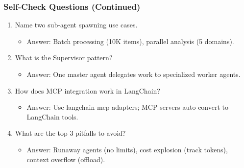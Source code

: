 \documentclass[aspectratio=169,11pt]{beamer}
\begin{document}
\begin{frame}[fragile]
\frametitle{Self-Check Questions (Continued)}

\begin{enumerate}
    \setlength{\itemsep}{1pt}
  \setcounter{enumi}{4}
  \item Name two sub-agent spawning use cases.
  \begin{itemize}
    \setlength{\itemsep}{1pt}
    \small
    \item {\color{docgray}Answer: Batch processing (10K items), parallel analysis (5 domains).}
  \end{itemize}

  \vspace{0.5em}
  \item What is the Supervisor pattern?
  \begin{itemize}
    \setlength{\itemsep}{1pt}
    \small
    \item {\color{docgray}Answer: One master agent delegates work to specialized worker agents.}
  \end{itemize}

  \vspace{0.5em}
  \item How does MCP integration work in LangChain?
  \begin{itemize}
    \setlength{\itemsep}{1pt}
    \small
    \item {\color{docgray}Answer: Use langchain-mcp-adapters; MCP servers auto-convert to LangChain tools.}
  \end{itemize}

  \vspace{0.5em}
  \item What are the top 3 pitfalls to avoid?
  \begin{itemize}
    \setlength{\itemsep}{1pt}
    \small
    \item {\color{docgray}Answer: Runaway agents (no limits), cost explosion (track tokens), context overflow (offload).}
  \end{itemize}
\end{enumerate}

\end{frame}
\end{document}
